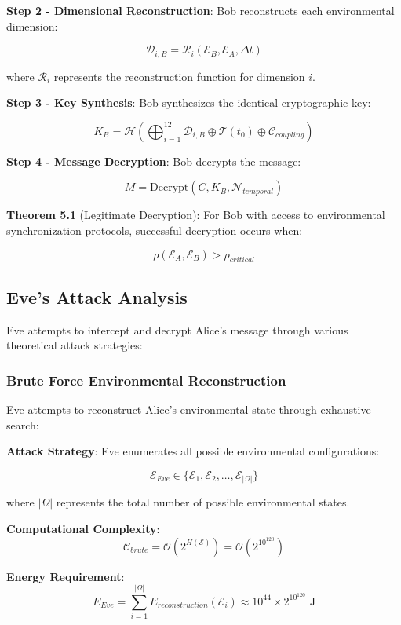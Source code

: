 \documentclass[12pt]{article}
\begin{document}
\textbf{Step 2 - Dimensional Reconstruction}: Bob reconstructs each environmental dimension:

$$\mathcal{D}_{i,B} = \mathcal{R}_i\left(\mathcal{E}_B, \mathcal{E}_A, \Delta t\right)$$

where $\mathcal{R}_i$ represents the reconstruction function for dimension $i$.

\textbf{Step 3 - Key Synthesis}: Bob synthesizes the identical cryptographic key:

$$K_B = \mathcal{H}\left(\bigoplus_{i=1}^{12} \mathcal{D}_{i,B} \oplus \mathcal{T}(t_0) \oplus \mathcal{C}_{coupling}\right)$$

\textbf{Step 4 - Message Decryption}: Bob decrypts the message:

$$M = \text{Decrypt}(C, K_B, \mathcal{N}_{temporal})$$

\textbf{Theorem 5.1} (Legitimate Decryption): For Bob with access to environmental synchronization protocols, successful decryption occurs when:

$$\rho(\mathcal{E}_A, \mathcal{E}_B) > \rho_{critical}$$

\subsection{Eve's Attack Analysis}

Eve attempts to intercept and decrypt Alice's message through various theoretical attack strategies:

\subsubsection{Brute Force Environmental Reconstruction}

Eve attempts to reconstruct Alice's environmental state through exhaustive search:

\textbf{Attack Strategy}: Eve enumerates all possible environmental configurations:

$$\mathcal{E}_{Eve} \in \{\mathcal{E}_1, \mathcal{E}_2, \ldots, \mathcal{E}_{|\Omega|}\}$$

where $|\Omega|$ represents the total number of possible environmental states.

\textbf{Computational Complexity}:
$$\mathcal{C}_{brute} = \mathcal{O}(2^{H(\mathcal{E})}) = \mathcal{O}(2^{10^{120}})$$

\textbf{Energy Requirement}:
$$E_{Eve} = \sum_{i=1}^{|\Omega|} E_{reconstruction}(\mathcal{E}_i) \approx 10^{44} \times 2^{10^{120}} \text{ J}$$
\end{document}
